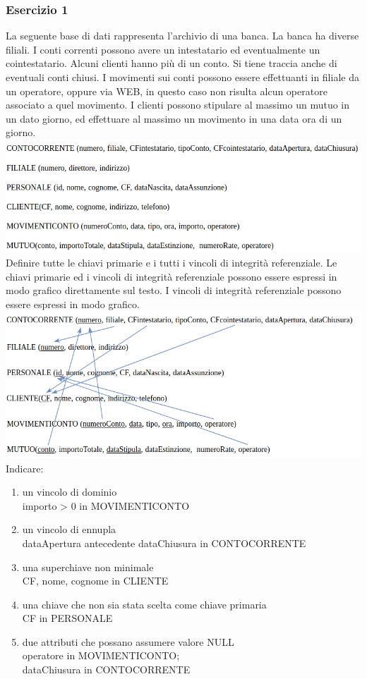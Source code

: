 \documentclass[a4paper]{article}
\begin{document}
\subsubsection{Esercizio 1}
La seguente base di dati rappresenta l’archivio di una banca. La banca ha diverse filiali. I conti correnti possono avere un intestatario ed eventualmente un cointestatario. Alcuni clienti hanno più di un conto. Si tiene traccia anche di eventuali conti chiusi. I movimenti sui conti possono essere effettuanti in filiale da un operatore, oppure via WEB, in questo caso non risulta alcun operatore associato a quel movimento. I clienti possono stipulare al massimo un mutuo in un dato giorno, ed effettuare al massimo un movimento in una data ora di un giorno.\medskip\medskip\\
\includegraphics[scale=0.4]{img/rel1.png}
%
Definire tutte le chiavi primarie e i tutti i vincoli di integrità referenziale. Le chiavi primarie ed i vincoli di integrità referenziale possono essere espressi in modo grafico direttamente sul testo. I vincoli di integrità referenziale possono essere espressi in  modo grafico.\medskip\\
\includegraphics[scale=0.4]{img/rel2.png}\medskip\medskip\\
Indicare:
\begin{enumerate}[leftmargin=*]
  \item un vincolo di dominio \\importo > 0 in MOVIMENTICONTO
  \item un vincolo di ennupla \\dataApertura antecedente dataChiusura in CONTOCORRENTE
  \item una superchiave non minimale \\CF, nome, cognome in CLIENTE
  \item una chiave che non sia stata scelta come chiave primaria \\CF in PERSONALE
  \item due attributi che possano assumere valore NULL \\operatore in MOVIMENTICONTO;\\dataChiusura in CONTOCORRENTE
\end{enumerate}
\end{document}
